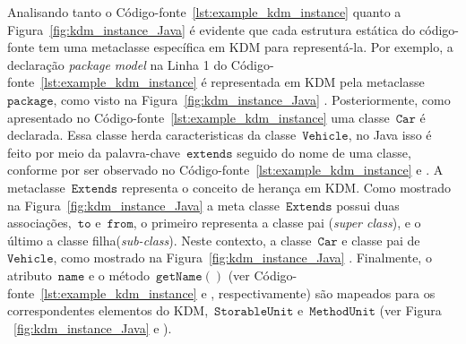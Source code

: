 Analisando tanto o Código-fonte~\ref{lst:example_kdm_instance} quanto a Figura~\ref{fig:kdm_instance_Java} é evidente que cada estrutura estática do código-fonte tem uma metaclasse específica em KDM para representá-la. Por exemplo, a declaração \textit{package} \textit{model} na Linha 1 do Código-fonte~\ref{lst:example_kdm_instance}  é representada em KDM pela metaclasse ~$\mathtt{package}$, como visto na Figura~\ref{fig:kdm_instance_Java} . Posteriormente, como apresentado no Código-fonte~\ref{lst:example_kdm_instance}  uma classe~$\mathtt{Car}$ é declarada. Essa classe herda caracteristicas da classe~$\mathtt{Vehicle}$, no Java isso é feito por meio da palavra-chave~$\mathtt{extends}$ seguido do nome de uma classe, conforme por ser observado no Código-fonte~\ref{lst:example_kdm_instance}  e . A metaclasse~$\mathtt{Extends}$ representa o conceito de herança em KDM. Como mostrado na Figura~\ref{fig:kdm_instance_Java}  a meta classe~$\mathtt{Extends}$ possui duas associações,~$\mathtt{to}$ e~$\mathtt{from}$, o primeiro representa a classe pai (\textit{super class}), e o último a classe filha(\textit{sub-class}). Neste contexto, a classe~$\mathtt{Car}$ e classe pai de~$\mathtt{Vehicle}$, como mostrado na Figura~\ref{fig:kdm_instance_Java} . Finalmente, o atributo~$\mathtt{name}$ e o método~$\mathtt{getName()}$ (ver Código-fonte~\ref{lst:example_kdm_instance}  e , respectivamente) são mapeados para os correspondentes elementos do KDM,~$\mathtt{StorableUnit}$ e~$\mathtt{MethodUnit}$ (ver Figura ~\ref{fig:kdm_instance_Java}  e ).



